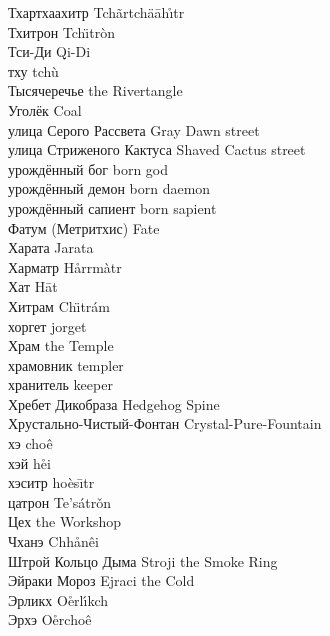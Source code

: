 Тхартхаахитр \hfill Tch\~{a}rtch\"{a}\={a}h\r{\i}tr\\
Тхитрон \hfill Tch\"{\i}tr\`{o}n\\
Тси-Ди \hfill Qi-Di\\
тху \hfill tch\`{u}\\
Тысячеречье \hfill the Rivertangle\\
Уголёк \hfill Coal\\
улица Серого Рассвета \hfill Gray Dawn street\\
улица Стриженого Кактуса \hfill Shaved Cactus street\\
урождённый бог \hfill born god\\
урождённый демон \hfill born daemon\\
урождённый сапиент \hfill born sapient\\
Фатум (Метритхис) \hfill Fate\\
Харата \hfill Jarata\\
Харматр \hfill H\r{a}rrm\`{a}tr\\
Хат \hfill H\={a}t\\
Хитрам \hfill Ch\"{\i}tr\'{a}m\\
хоргет \hfill jorget\\
Храм \hfill the Temple\\
храмовник \hfill templer\\
хранитель \hfill keeper\\
Хребет Дикобраза \hfill Hedgehog Spine\\
Хрустально-Чистый-Фонтан \hfill Crystal-Pure-Fountain\\
хэ \hfill cho\^{e}\\
хэй \hfill h\r{e}i\\
хэситр \hfill ho\`{e}s\={\i}tr\\
цатрон \hfill Te's\'{a}tr\v{o}n\\
Цех \hfill the Workshop\\
Чханэ \hfill Chh\r{a}n\^{e}i\\
Штрой Кольцо Дыма \hfill Stroji the Smoke Ring\\
Эйраки Мороз \hfill Ejraci the Cold\\
Эрликх \hfill O\r{e}rl\'{\i}kch\\
Эрхэ \hfill O\r{e}rcho\^{e}\\
